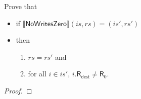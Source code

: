 \documentclass[12pt, letterpaper]{article}
\newcommand\interp[1]{\llbracket #1 \rrbracket}
\begin{document}
Prove that
\begin{itemize}
\item  if
  $\interp{ \mathsf{NoWritesZero} } (\mathit{is}, \mathit{rs}) =
  (\mathit{is}', \mathit{rs}')$
\item then
  \begin{enumerate}
  \item $\mathit{rs} = \mathit{rs'}$ and
  \item for all $i \in \mathit{is}'$, $i.\mathsf{R}_{\mathsf{dest}} \neq \mathsf{R}_0$.
  \end{enumerate}
\end{itemize}
\begin{proof}


\end{proof}
\end{document}
